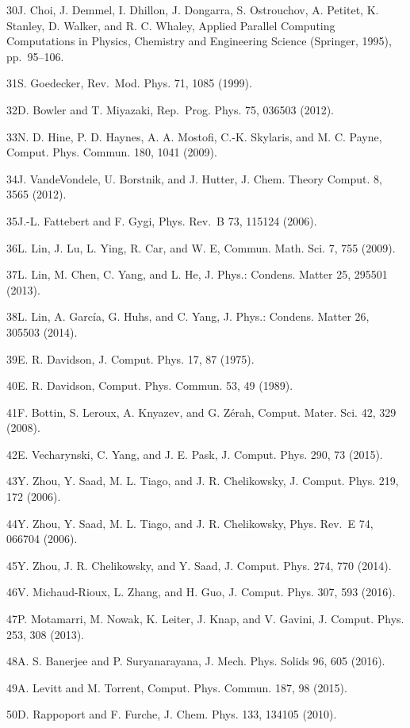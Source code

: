 \documentclass[
  10
]{article}
\begin{document}
30J. Choi, J. Demmel, I. Dhillon, J. Dongarra, S. Ostrouchov, A.
Petitet, K. Stanley, D. Walker, and R. C. Whaley, Applied Parallel
Computing Computations in Physics, Chemistry and Engineering Science
(Springer, 1995), pp.~95--106.

31S. Goedecker, Rev.~Mod. Phys. 71, 1085 (1999).

32D. Bowler and T. Miyazaki, Rep.~Prog. Phys. 75, 036503 (2012).

33N. D. Hine, P. D. Haynes, A. A. Mostofi, C.-K. Skylaris, and M. C.
Payne, Comput. Phys. Commun. 180, 1041 (2009).

34J. VandeVondele, U. Borstnik, and J. Hutter, J. Chem. Theory Comput.
8, 3565 (2012).

35J.-L. Fattebert and F. Gygi, Phys. Rev.~B 73, 115124 (2006).

36L. Lin, J. Lu, L. Ying, R. Car, and W. E, Commun. Math. Sci. 7, 755
(2009).

37L. Lin, M. Chen, C. Yang, and L. He, J. Phys.: Condens. Matter 25,
295501 (2013).

38L. Lin, A. García, G. Huhs, and C. Yang, J. Phys.: Condens. Matter 26,
305503 (2014).

39E. R. Davidson, J. Comput. Phys. 17, 87 (1975).

40E. R. Davidson, Comput. Phys. Commun. 53, 49 (1989).

41F. Bottin, S. Leroux, A. Knyazev, and G. Zérah, Comput. Mater. Sci.
42, 329 (2008).

42E. Vecharynski, C. Yang, and J. E. Pask, J. Comput. Phys. 290, 73
(2015).

43Y. Zhou, Y. Saad, M. L. Tiago, and J. R. Chelikowsky, J. Comput. Phys.
219, 172 (2006).

44Y. Zhou, Y. Saad, M. L. Tiago, and J. R. Chelikowsky, Phys. Rev.~E 74,
066704 (2006).

45Y. Zhou, J. R. Chelikowsky, and Y. Saad, J. Comput. Phys. 274, 770
(2014).

46V. Michaud-Rioux, L. Zhang, and H. Guo, J. Comput. Phys. 307, 593
(2016).

47P. Motamarri, M. Nowak, K. Leiter, J. Knap, and V. Gavini, J. Comput.
Phys. 253, 308 (2013).

48A. S. Banerjee and P. Suryanarayana, J. Mech. Phys. Solids 96, 605
(2016).

49A. Levitt and M. Torrent, Comput. Phys. Commun. 187, 98 (2015).

50D. Rappoport and F. Furche, J. Chem. Phys. 133, 134105 (2010).
\end{document}
